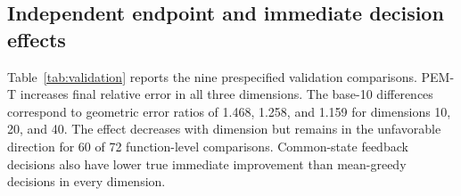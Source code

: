 \documentclass[]{interact}
\begin{document}
\hypertarget{independent-endpoint-and-immediate-decision-effects}{%
\subsection{Independent endpoint and immediate decision effects}\label{independent-endpoint-and-immediate-decision-effects}}

Table~\ref{tab:validation} reports the nine prespecified validation comparisons. PEM-T increases final relative error in all three dimensions. The base-10 differences correspond to geometric error ratios of 1.468, 1.258, and 1.159 for dimensions 10, 20, and 40. The effect decreases with dimension but remains in the unfavorable direction for 60 of 72 function-level comparisons. Common-state feedback decisions also have lower true immediate improvement than mean-greedy decisions in every dimension.

\FloatBarrier\begingroup\fontsize{8.5}{10.5}\selectfont\setlength\tabcolsep{3pt}
\end{document}

